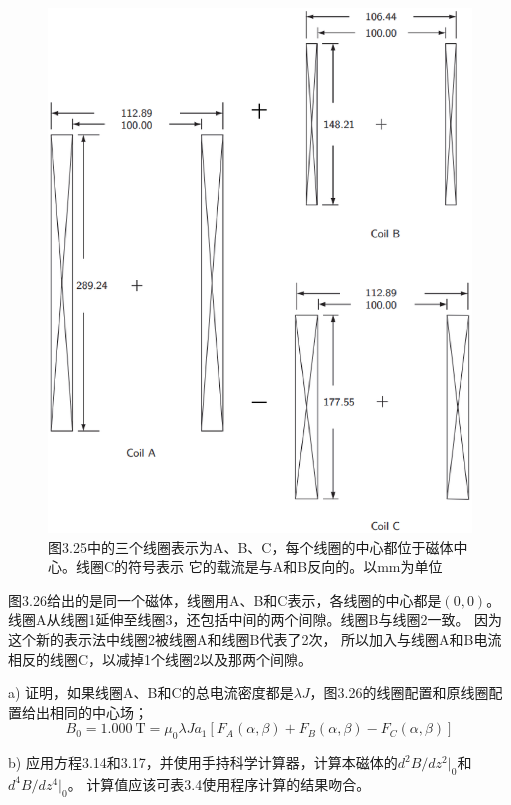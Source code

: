 \begin{figure}[htbp]
	\centering
	\includegraphics[scale=0.6]{chpt3/figs/fig3.26.eps}
	\caption{图3.25中的三个线圈表示为A、B、C，每个线圈的中心都位于磁体中心。线圈C的符号表示
		它的载流是与A和B反向的。以mm为单位}
\end{figure}
图3.26给出的是同一个磁体，线圈用A、B和C表示，各线圈的中心都是$(0,0)$。
线圈A从线圈1延伸至线圈3，还包括中间的两个间隙。线圈B与线圈2一致。
因为这个新的表示法中线圈2被线圈A和线圈B代表了2次，
所以加入与线圈A和B电流相反的线圈C，以减掉1个线圈2以及那两个间隙。

a) 证明，如果线圈A、B和C的总电流密度都是$\lambda J$，图3.26的线圈配置和原线圈配置给出相同的中心场；
\begin{equation} %
B_0 = 1.000\ \mathrm{T}=\mu_0\lambda J a_1[F_A(\alpha,\beta)+F_B(\alpha,\beta)-F_C(\alpha,\beta)]
\end{equation}

b) 应用方程3.14和3.17，并使用手持科学计算器，计算本磁体的$d^2B/dz^2|_0$和$d^4B/dz^4|_0$。
计算值应该可表3.4使用程序计算的结果吻合。

